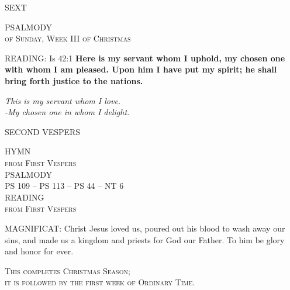 \begin{flushleft}\normalsize{\uppercase{SEXT\\}}\end{flushleft}
\noindent\small{\uppercase{PSALMODY}\\} 
\textsc{of Sunday, Week III of Christmas\\}

\noindent\small{\uppercase{READING:}}  Is 42:1 \textbf{ Here is my servant whom I uphold, my chosen one with whom I am pleased. Upon him I have put my spirit; he shall bring forth justice to the nations.}
\begin{center}\textit{This is my servant whom I love.\\
-My chosen one in whom I delight.}\end{center}

\begin{flushleft}\normalsize{\uppercase{SECOND VESPERS\\}}\end{flushleft}

\noindent\small{\uppercase{HYMN\\}} 
\textsc{from First Vespers}\\

\noindent\small{\uppercase{PSALMODY}\\}
\uppercase{Ps 109 -- Ps 113 -- Ps 44 -- NT 6}\vspace{0.5em}\\

\noindent\small\uppercase {READING\\}
\textsc{from First Vespers\\}

\noindent\small{\uppercase{MAGNIFICAT:}}	Christ Jesus loved us, poured out his blood to wash away our sins, and made us a kingdom and priests for God our Father. To him be glory and honor for ever.\\

\begin{center}\noindent\textsc{\small{This completes Christmas Season;\\
it is followed by the first week of Ordinary Time.}}\end{center}



